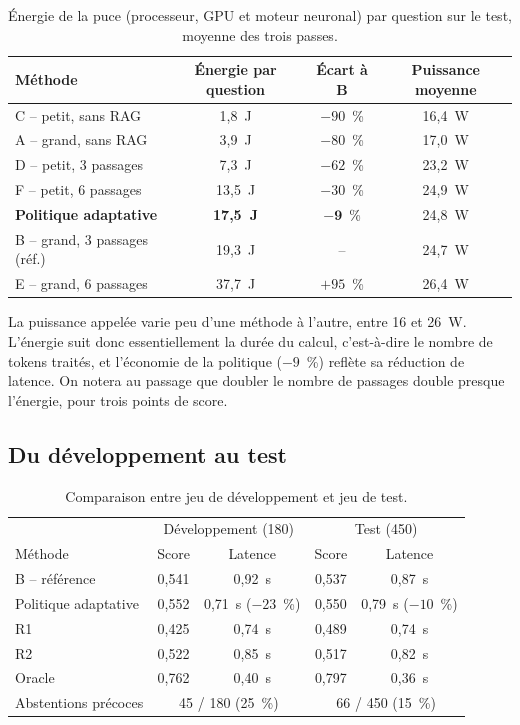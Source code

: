 \documentclass[11pt,a4paper]{article}
\begin{document}
\begin{table}[H]
\centering\small
\begin{tabular}{l c c c}
\toprule
Méthode & Énergie par question & Écart à B & Puissance moyenne \\
\midrule
C -- petit, sans RAG & 1,8~J & $-90$~\% & 16,4~W \\
A -- grand, sans RAG & 3,9~J & $-80$~\% & 17,0~W \\
D -- petit, 3 passages & 7,3~J & $-62$~\% & 23,2~W \\
F -- petit, 6 passages & 13,5~J & $-30$~\% & 24,9~W \\
\textbf{Politique adaptative} & \textbf{17,5~J} & $\mathbf{-9}$~\% & 24,8~W \\
B -- grand, 3 passages (réf.) & 19,3~J & -- & 24,7~W \\
E -- grand, 6 passages & 37,7~J & $+95$~\% & 26,4~W \\
\bottomrule
\end{tabular}
\caption{Énergie de la puce (processeur, GPU et moteur neuronal) par question sur le test, moyenne des
trois passes.}
\label{tab:energie}
\end{table}

La puissance appelée varie peu d'une méthode à l'autre, entre 16 et 26~W. L'énergie suit donc
essentiellement la durée du calcul, c'est-à-dire le nombre de tokens traités, et l'économie de la
politique ($-9$~\%) reflète sa réduction de latence. On notera au passage que doubler le nombre de
passages double presque l'énergie, pour trois points de score.

\subsection{Du développement au test}

\begin{table}[H]
\centering\small
\begin{tabular}{l c c c c}
\toprule
& \multicolumn{2}{c}{Développement (180)} & \multicolumn{2}{c}{Test (450)} \\
Méthode & Score & Latence & Score & Latence \\
\midrule
B -- référence & 0,541 & 0,92~s & 0,537 & 0,87~s \\
Politique adaptative & 0,552 & 0,71~s ($-23$~\%) & 0,550 & 0,79~s ($-10$~\%) \\
R1 & 0,425 & 0,74~s & 0,489 & 0,74~s \\
R2 & 0,522 & 0,85~s & 0,517 & 0,82~s \\
Oracle & 0,762 & 0,40~s & 0,797 & 0,36~s \\
\midrule
Abstentions précoces & \multicolumn{2}{c}{45 / 180 (25~\%)} & \multicolumn{2}{c}{66 / 450 (15~\%)} \\
\bottomrule
\end{tabular}
\caption{Comparaison entre jeu de développement et jeu de test.}
\label{tab:dev-test}
\end{table}
\end{document}
